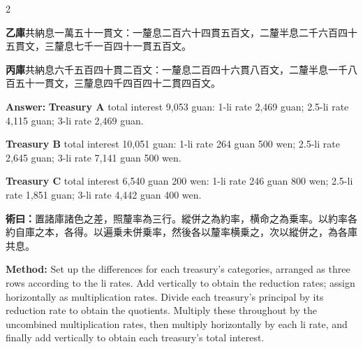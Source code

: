 \documentclass[11pt,a4paper]{article}
\newcommand{\MethodText}[1]{\par\noindent\textbf{\color{methodcolor}術曰：}#1\par}
\newcommand{\AnswerEn}[1]{\par\noindent\textbf{\color{answercolor}Answer:} #1\par}
\newcommand{\MethodEn}[1]{\par\noindent\textbf{\color{methodcolor}Method:} #1\par}
\begin{document}
\begin{paracol}{2}
{\textbf{乙庫}共納息一萬五十一貫文：一釐息二百六十四貫五百文，二釐半息二千六百四十五貫文，三釐息七千一百四十一貫五百文。

\textbf{丙庫}共納息六千五百四十貫二百文：一釐息二百四十六貫八百文，二釐半息一千八百五十一貫文，三釐息四千四百四十二貫四百文。}
\switchcolumn
\AnswerEn{\textbf{Treasury A} total interest 9,053 guan: 1-li rate 2,469 guan; 2.5-li rate 4,115 guan; 3-li rate 2,469 guan.

\textbf{Treasury B} total interest 10,051 guan: 1-li rate 264 guan 500 wen; 2.5-li rate 2,645 guan; 3-li rate 7,141 guan 500 wen.

\textbf{Treasury C} total interest 6,540 guan 200 wen: 1-li rate 246 guan 800 wen; 2.5-li rate 1,851 guan; 3-li rate 4,442 guan 400 wen.}
\switchcolumn*

\MethodText{置諸庫諸色之差，照釐率為三行。縱併之為約率，横命之為乗率。以約率各約自庫之本，各得。以遍乗未併乗率，然後各以釐率横乗之，次以縱併之，為各庫共息。}
\switchcolumn
\MethodEn{Set up the differences for each treasury's categories, arranged as three rows according to the li rates. Add vertically to obtain the reduction rates; assign horizontally as multiplication rates. Divide each treasury's principal by its reduction rate to obtain the quotients. Multiply these throughout by the uncombined multiplication rates, then multiply horizontally by each li rate, and finally add vertically to obtain each treasury's total interest.}
\switchcolumn*


\end{paracol}
\end{document}
